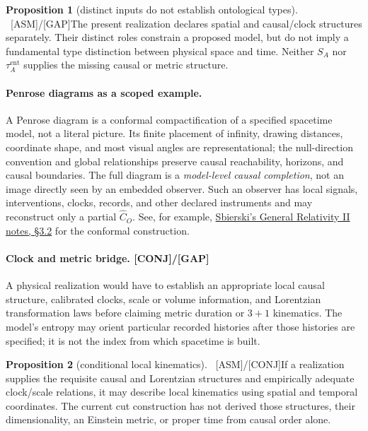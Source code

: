 \documentclass[11pt]{article}
\newcommand{\asm}{\textcolor{blue!70!black}{\textsf{\small[ASM]}}}
\newcommand{\conj}{\textcolor{orange!80!black}{\textsf{\small[CONJ]}}}
\newcommand{\post}{\textcolor{purple!70!black}{\textsf{\small[POST]}}}
\newcommand{\gap}{\textcolor{red!75!black}{\textsf{\small[GAP]}}}
\def\conj{[CONJ]}\def\post{[POST]}\def\gap{[GAP]}%
\theoremstyle{definition}
\newtheorem{proposition}{Proposition}[section]
\theoremstyle{remark}
\begin{document}
\begin{proposition}[distinct inputs do not establish ontological types]{\normalfont\ \asm/\gap}\label{prop:diftype}
The present realization declares spatial and causal/clock structures separately. Their distinct roles constrain a proposed model, but do not imply a fundamental type distinction between physical space and time. Neither $S_A$ nor $\tau_A^{\mathrm{ent}}$ supplies the missing causal or metric structure.
\end{proposition}

\paragraph{Penrose diagrams as a scoped example.}
A Penrose diagram is a conformal compactification of a specified spacetime model, not a literal picture. Its finite placement of infinity, drawing distances, coordinate shape, and most visual angles are representational; the null-direction convention and global relationships preserve causal reachability, horizons, and causal boundaries. The full diagram is a \emph{model-level causal completion}, not an image directly seen by an embedded observer. Such an observer has local signals, interventions, clocks, records, and other declared instruments and may reconstruct only a partial $\widehat C_O$. See, for example, \href{https://www.maths.ed.ac.uk/~jsbiersk/assets/LectureNotesGRII.pdf}{Sbierski's General Relativity II notes, \S3.2} for the conformal construction.

\paragraph{Clock and metric bridge. \conj/\gap}
A physical realization would have to establish an appropriate local causal structure, calibrated clocks, scale or volume information, and Lorentzian transformation laws before claiming metric duration or $3{+}1$ kinematics. The model's entropy may orient particular recorded histories after those histories are specified; it is not the index from which spacetime is built.

\begin{proposition}[conditional local kinematics]{\normalfont\ \asm/\conj}\label{prop:threeone}
If a realization supplies the requisite causal and Lorentzian structures and empirically adequate clock/scale relations, it may describe local kinematics using spatial and temporal coordinates. The current cut construction has not derived those structures, their dimensionality, an Einstein metric, or proper time from causal order alone.
\end{proposition}
\end{document}
